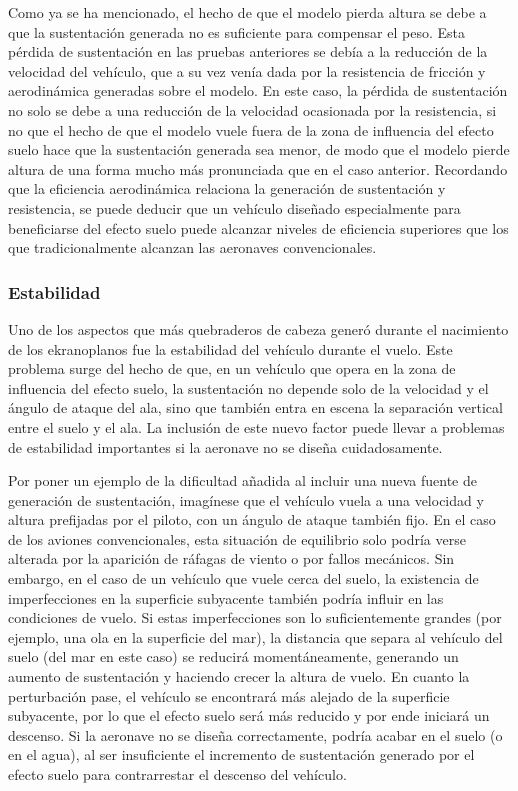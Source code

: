 Como ya se ha mencionado, el hecho de que el modelo pierda altura se debe a que la sustentación generada no es suficiente para compensar el peso. Esta pérdida de sustentación en las pruebas anteriores se debía a la reducción de la velocidad del vehículo, que a su vez venía dada por la resistencia de fricción y aerodinámica generadas sobre el modelo. En este caso, la pérdida de sustentación no solo se debe a una reducción de la velocidad ocasionada por la resistencia, si no que el hecho de que el modelo vuele fuera de la zona de influencia del efecto suelo hace que la sustentación generada sea menor, de modo que el modelo pierde altura de una forma mucho más pronunciada que en el caso anterior. Recordando que la eficiencia aerodinámica relaciona la generación de sustentación y resistencia, se puede deducir que un vehículo diseñado especialmente para beneficiarse del efecto suelo puede alcanzar niveles de eficiencia superiores que los que tradicionalmente alcanzan las aeronaves convencionales.


\subsubsection{Estabilidad}
\label{sec:tests:results:stability}

Uno de los aspectos que más quebraderos de cabeza generó durante el nacimiento de los ekranoplanos fue la estabilidad del vehículo durante el vuelo. Este problema surge del hecho de que, en un vehículo que opera en la zona de influencia del efecto suelo, la sustentación no depende solo de la velocidad y el ángulo de ataque del ala, sino que también entra en escena la separación vertical entre el suelo y el ala. La inclusión de este nuevo factor puede llevar a problemas de estabilidad importantes si la aeronave no se diseña cuidadosamente.

Por poner un ejemplo de la dificultad añadida al incluir una nueva fuente de generación de sustentación, imagínese que el vehículo vuela a una velocidad y altura prefijadas por el piloto, con un ángulo de ataque también fijo. En el caso de los aviones convencionales, esta situación de equilibrio solo podría verse alterada por la aparición de ráfagas de viento o por fallos mecánicos. Sin embargo, en el caso de un vehículo que vuele cerca del suelo, la existencia de imperfecciones en la superficie subyacente también podría influir en las condiciones de vuelo. Si estas imperfecciones son lo suficientemente grandes (por ejemplo, una ola en la superficie del mar), la distancia que separa al vehículo del suelo (del mar en este caso) se reducirá momentáneamente, generando un aumento de sustentación y haciendo crecer la altura de vuelo. En cuanto la perturbación pase, el vehículo se encontrará más alejado de la superficie subyacente, por lo que el efecto suelo será más reducido y por ende iniciará un descenso. Si la aeronave no se diseña correctamente, podría acabar en el suelo (o en el agua), al ser insuficiente el incremento de sustentación generado por el efecto suelo para contrarrestar el descenso del vehículo.

